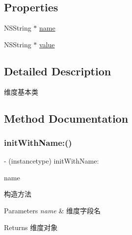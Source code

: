 \subsection*{Properties}
\begin{DoxyCompactItemize}
\item 
N\+S\+String $\ast$ \mbox{\hyperlink{interface_alibc_trade_dimension_abd71d81dc6c347d8ab12e84bfcf664cb}{name}}
\item 
N\+S\+String $\ast$ \mbox{\hyperlink{interface_alibc_trade_dimension_a649215b5a333501cb80eebb6b4c9a8e7}{value}}
\end{DoxyCompactItemize}


\subsection{Detailed Description}
维度基本类 

\subsection{Method Documentation}
\mbox{\label{interface_alibc_trade_dimension_a2df6a6cfa8924b826bc717db2d8ea518}} 
\subsubsection{\texorpdfstring{init\+With\+Name\+:()}{initWithName:()}}
{\footnotesize\ttfamily -\/ (instancetype) init\+With\+Name\+: \begin{DoxyParamCaption}\item[{(nonnull N\+S\+String $\ast$)}]{name }\end{DoxyParamCaption}}

构造方法


\begin{DoxyParams}{Parameters}
{\em name} & 维度字段名 \\
\hline
\end{DoxyParams}
\begin{DoxyReturn}{Returns}
维度对象 
\end{DoxyReturn}
\mbox{\label{interface_alibc_trade_dimension_a6d586f1f92f9b2273ed6794101aa7589}} 
